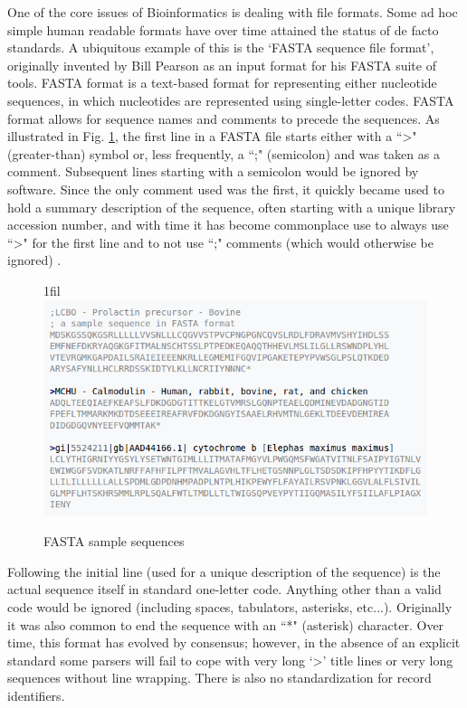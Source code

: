 \documentclass[12pt,openany]{llncs}
\makeatletter
\newcommand*{\centerfloat}{%
  \parindent \z@
  \leftskip \z@ \@plus 1fil \@minus \textwidth
  \rightskip\leftskip
  \parfillskip \z@skip}
\makeatother
\begin{document}
\newpage
One of the core issues of Bioinformatics is dealing with file formats. Some ad hoc simple human readable formats have over time attained the status of de facto standards. A ubiquitous example of this is the ‘FASTA sequence file format’, originally invented by Bill Pearson as an input format for his FASTA suite of tools.
FASTA format is a text-based format for representing either nucleotide sequences, in which nucleotides are represented using single-letter codes. FASTA format allows for sequence names and comments to precede the sequences. As illustrated in Fig. \ref{fig:fig-NGS-5}, the first line in a FASTA file starts either with a ``\textgreater" (greater-than) symbol or, less frequently, a ``;" (semicolon) and was taken as a comment. Subsequent lines starting with a semicolon would be ignored by software. Since the only comment used was the first, it quickly became used to hold a summary description of the sequence, often starting with a unique library accession number, and with time it has become commonplace use to always use ``\textgreater" for the first line and to not use ``;" comments (which would otherwise be ignored) \cite{fasta-fastq1}.
\begin{figure}
	\centerfloat
	\includegraphics[width=0.8\linewidth]{./figs/NGS-5}
	\caption{\label{fig:fig-NGS-5}FASTA sample sequences}
\end{figure}
Following the initial line (used for a unique description of the sequence) is the actual sequence itself in standard one-letter code. Anything other than a valid code would be ignored (including spaces, tabulators, asterisks, etc...). Originally it was also common to end the sequence with an ``*" (asterisk) character. 
Over time, this format has evolved by consensus; however, in the absence of an explicit standard some parsers will fail to cope with very long ‘\textgreater’ title lines or very long sequences without line wrapping. There is also no standardization for record identifiers.
\end{document}
